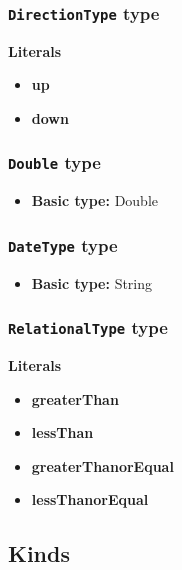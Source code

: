 \subsubsection{\texttt{DirectionType} type}

\textbf{Literals}
\begin{itemize}
\item \textbf{up} 
\end{itemize}
\begin{itemize}
\item \textbf{down} 
\end{itemize}

\subsubsection{\texttt{Double} type}

\begin{itemize}
\item \textbf{Basic type:} Double
\end{itemize}
\subsubsection{\texttt{DateType} type}

\begin{itemize}
\item \textbf{Basic type:} String
\end{itemize}
\subsubsection{\texttt{RelationalType} type}

\textbf{Literals}
\begin{itemize}
\item \textbf{greaterThan} 
\end{itemize}
\begin{itemize}
\item \textbf{lessThan} 
\end{itemize}
\begin{itemize}
\item \textbf{greaterThanorEqual} 
\end{itemize}
\begin{itemize}
\item \textbf{lessThanorEqual} 
\end{itemize}

\subsection{Kinds}
